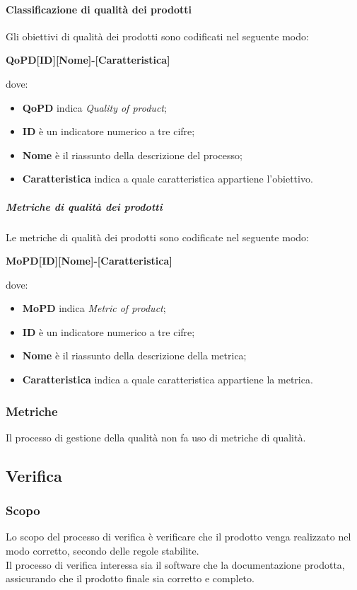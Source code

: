 \documentclass[../norme-di-progetto.tex]{subfiles}
\begin{document}
\paragraph{Classificazione di qualità dei prodotti}
Gli obiettivi di qualità dei prodotti sono codificati nel seguente modo: \\
\begin{center}
  \centering
  \textbf{QoPD[ID][Nome]-[Caratteristica]}
\end{center} dove:
\begin{itemize}
  \item \textbf{QoPD} indica \textit{Quality of product};
  \item \textbf{ID} è un indicatore numerico a tre cifre;
  \item \textbf{Nome} è il riassunto della descrizione del processo;
  \item \textbf{Caratteristica} indica a quale caratteristica appartiene l'obiettivo.
\end{itemize}

\subparagraph{Metriche di qualità dei prodotti}
Le metriche di qualità dei prodotti sono codificate nel seguente modo:
\begin{center}
  \centering
  \textbf{MoPD[ID][Nome]-[Caratteristica]}
\end{center} dove:
\begin{itemize}
  \item \textbf{MoPD} indica \textit{Metric of product};
  \item \textbf{ID} è un indicatore numerico a tre cifre;
  \item \textbf{Nome} è il riassunto della descrizione della metrica;
  \item \textbf{Caratteristica} indica a quale caratteristica appartiene la metrica.
\end{itemize}

\subsubsection{Metriche}
Il processo di gestione della qualità non fa uso di metriche di qualità.

\subsection{Verifica}

\subsubsection{Scopo}
Lo scopo del processo di verifica è verificare che il prodotto venga realizzato nel modo corretto, secondo delle regole stabilite. \\
Il processo di verifica interessa sia il software che la documentazione prodotta, assicurando che il prodotto finale sia corretto e completo.
\end{document}
